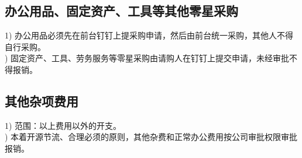 \documentclass[]{article}
\begin{document}




\subsection{办公用品、固定资产、工具等其他零星采购}
1) 办公用品必须先在前台钉钉上提采购申请，然后由前台统一采购，其他人不得自行采购。\\) 固定资产、工具、劳务服务等零星采购由请购人在钉钉上提交申请，未经审批不得报销。

\subsection{其他杂项费用}

1)	范围：以上费用以外的开支。\\)	本着开源节流、合理必须的原则，其他杂费和正常办公费用按公司审批权限审批报销。
\end{document}
